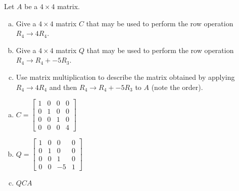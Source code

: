 
\begin{exerciseStatement}


Let \(A\) be a \(4 \times 4\) matrix.


\begin{enumerate}[(a)]
\item Give a \(4 \times 4\) matrix \(C\) that may be used to perform the row operation \( R_4 \to 4R_4 \).
\item Give a \(4 \times 4\) matrix \(Q\) that may be used to perform the row operation \( R_4 \to R_4 + -5R_3 \).
\item Use matrix multiplication to describe the matrix obtained by applying \( R_4 \to 4R_4 \) and then \( R_4 \to R_4 + -5R_3 \) to \(A\) (note the order). 
\end{enumerate}
    
\end{exerciseStatement}
    
\begin{exerciseAnswer} 

\begin{enumerate}[(a)]
\item \(C= \left[\begin{array}{cccc}
1 & 0 & 0 & 0 \\
0 & 1 & 0 & 0 \\
0 & 0 & 1 & 0 \\
0 & 0 & 0 & 4
\end{array}\right] \)
\item \(Q= \left[\begin{array}{cccc}
1 & 0 & 0 & 0 \\
0 & 1 & 0 & 0 \\
0 & 0 & 1 & 0 \\
0 & 0 & -5 & 1
\end{array}\right] \)
\item \(QCA\)
\end{enumerate}
    
\end{exerciseAnswer}
    

